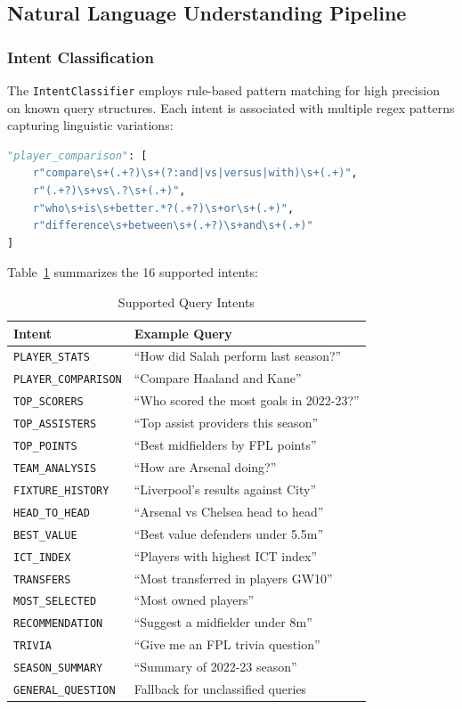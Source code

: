 \documentclass[11pt, a4paper]{article}
\begin{document}
\subsection{Natural Language Understanding Pipeline}

\subsubsection{Intent Classification}
The \texttt{IntentClassifier} employs rule-based pattern matching for high precision on known query structures. Each intent is associated with multiple regex patterns capturing linguistic variations:

\begin{lstlisting}[language=Python, caption={Intent Pattern Example: Player Comparison}]
"player_comparison": [
    r"compare\s+(.+?)\s+(?:and|vs|versus|with)\s+(.+)",
    r"(.+?)\s+vs\.?\s+(.+)",
    r"who\s+is\s+better.*?(.+?)\s+or\s+(.+)",
    r"difference\s+between\s+(.+?)\s+and\s+(.+)"
]
\end{lstlisting}

Table~\ref{tab:intents} summarizes the 16 supported intents:

\begin{table}[H]
\centering
\caption{Supported Query Intents}
\label{tab:intents}
\begin{tabular}{@{}lp{7cm}@{}}
\toprule
\textbf{Intent} & \textbf{Example Query} \\
\midrule
\texttt{PLAYER\_STATS} & ``How did Salah perform last season?'' \\
\texttt{PLAYER\_COMPARISON} & ``Compare Haaland and Kane'' \\
\texttt{TOP\_SCORERS} & ``Who scored the most goals in 2022-23?'' \\
\texttt{TOP\_ASSISTERS} & ``Top assist providers this season'' \\
\texttt{TOP\_POINTS} & ``Best midfielders by FPL points'' \\
\texttt{TEAM\_ANALYSIS} & ``How are Arsenal doing?'' \\
\texttt{FIXTURE\_HISTORY} & ``Liverpool's results against City'' \\
\texttt{HEAD\_TO\_HEAD} & ``Arsenal vs Chelsea head to head'' \\
\texttt{BEST\_VALUE} & ``Best value defenders under 5.5m'' \\
\texttt{ICT\_INDEX} & ``Players with highest ICT index'' \\
\texttt{TRANSFERS} & ``Most transferred in players GW10'' \\
\texttt{MOST\_SELECTED} & ``Most owned players'' \\
\texttt{RECOMMENDATION} & ``Suggest a midfielder under 8m'' \\
\texttt{TRIVIA} & ``Give me an FPL trivia question'' \\
\texttt{SEASON\_SUMMARY} & ``Summary of 2022-23 season'' \\
\texttt{GENERAL\_QUESTION} & Fallback for unclassified queries \\
\bottomrule
\end{tabular}
\end{table}
\end{document}
